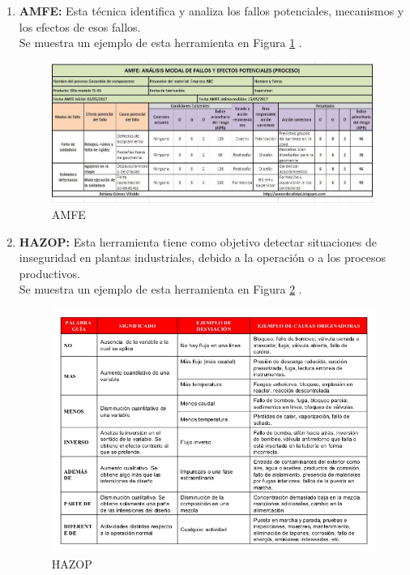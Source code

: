 \begin{enumerate}
\item {\bfseries AMFE:}
Esta técnica identifica y analiza los fallos potenciales, mecanismos y los efectos de esos fallos. \\
Se muestra un ejemplo de esta herramienta en Figura \ref{img:amfe} \cite{amfe}.
\begin{figure}[tphb]
  		   \centering
     		   \includegraphics[width=7in]{AMFE.jpg}
  		   \caption{AMFE}
  		   \label{img:amfe}
\end{figure}

\item {\bfseries HAZOP:}
Esta herramienta tiene como objetivo detectar situaciones de inseguridad en plantas industriales, debido a la operación o a los procesos productivos.\\
Se muestra un ejemplo de esta herramienta en Figura \ref{img:hazop} \cite{hazop}.
\begin{figure}[tphb]
  		   \centering
     		   \includegraphics[width=5in]{hazop.jpg}
  		   \caption{HAZOP}
  		   \label{img:hazop}
\end{figure}


\end{enumerate}
